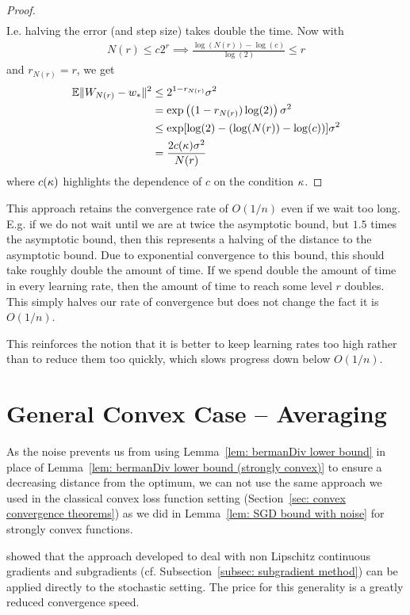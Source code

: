 \begin{proof}
\begin{align*}
	\end{align*}
	I.e. halving the error (and step size) takes double the time. Now with
	\begin{align*}
		N(r) \le c2^r \implies \frac{\log(N(r)) - \log(c)}{\log(2)} \le r
	\end{align*}
	and \(r_{N(r)} = r\), we get
	\begin{align*}
		\mathbb{E}\|W_{N(r)}-w_*\|^2 
		&\le 2^{1-r_{N(r)}}\sigma^2\\
		&= \exp\left((1-r_{N(r)})\log(2)\right)\sigma^2\\
		&\le \exp[\log(2)- (\log(N(r)) - \log(c))]\sigma^2\\
		&=  \frac{2c(\kappa)\sigma^2}{N(r)}
	\end{align*}
	where \(c(\kappa)\) highlights the dependence of \(c\) on the condition
	\(\kappa\).
\end{proof}

This approach retains the convergence rate of \(O(1/n)\) even if we wait too long.
E.g. if we do not wait until we are at twice the asymptotic bound, but \(1.5\)
times the asymptotic bound, then this represents a halving of the distance to
the asymptotic bound. Due to exponential convergence to this bound, this should
take roughly double the amount of time. If we spend double the amount of time in
every learning rate, then the amount of time to reach some level \(r\) doubles.
This simply halves our rate of convergence but does not change the fact it is
\(O(1/n)\).

This reinforces the notion that it is better to keep learning rates too high
rather than to reduce them too quickly, which slows progress down below \(O(1/n)\).

\section{General Convex Case -- Averaging}\label{sec: SGD with Averaging}

As the noise prevents us from using Lemma~\ref{lem: bermanDiv lower bound} in
place of Lemma~\ref{lem: bermanDiv lower bound (strongly convex)} to ensure a
decreasing distance from the optimum, we can not use the same approach we used
in the classical convex loss function setting (Section~\ref{sec: convex convergence theorems})
as we did in Lemma~\ref{lem: SGD bound with noise} for strongly convex functions.

\textcite{nemirovskiRobustStochasticApproximation2009} showed that the approach
developed to deal with non Lipschitz continuous gradients and subgradients (cf.
Subsection~\ref{subsec: subgradient method}) can be applied directly to the
stochastic setting. The price for this generality is a greatly reduced
convergence speed.

